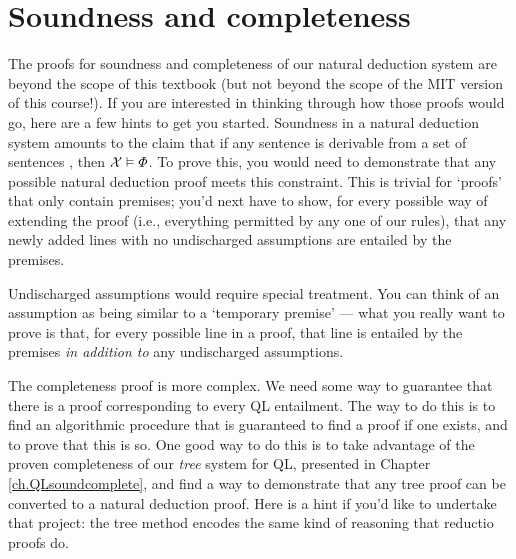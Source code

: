 \section{Soundness and completeness}

The proofs for soundness and completeness of our natural deduction system are beyond the scope of this textbook {\color{black} (but not beyond the scope of the MIT version of this course!)}. If you are interested in thinking through how those proofs would go, here are a few hints to get you started. Soundness in a natural deduction system amounts to the claim that if any sentence \metaA{} is derivable from a set of sentences \metaSetX{}, then $\mathcal{X}{}\vDash\varPhi{}$. To prove this, you would need to demonstrate that any possible natural deduction proof meets this constraint. This is trivial for `proofs' that only contain premises; you'd next have to show, for every possible way of extending the proof (i.e., everything permitted by any one of our rules), that any newly added lines with no undischarged assumptions are entailed by the premises.

Undischarged assumptions would require special treatment. You can think of an assumption as being similar to a `temporary premise' --- what you really want to prove is that, for every possible line in a proof, that line is entailed by the premises \emph{in addition to} any undischarged assumptions.

The completeness proof is more complex. We need some way to guarantee that there is a proof corresponding to every QL entailment. The way to do this is to find an algorithmic procedure that is guaranteed to find a proof if one exists, and to prove that this is so. One good way to do this is to take advantage of the proven completeness of our \emph{tree} system for QL, presented in Chapter \ref{ch.QLsoundcomplete}, and find a way to demonstrate that any tree proof can be converted to a natural deduction proof. Here is a hint if you'd like to undertake that project: the tree method encodes the same kind of reasoning that reductio proofs do.



\iffalse

\practiceproblems

